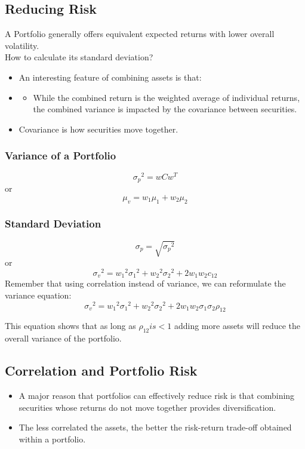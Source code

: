 \documentclass[11pt,a4paper]{report}
\begin{document}
\subsection{Reducing Risk}
A Portfolio generally offers equivalent expected returns with lower overall volatility.
\\How to calculate its standard deviation?
\begin{itemize}
    \item An interesting feature of combining assets is that:
    \item \begin{itemize}
        \item While the combined return is the weighted average of individual returns, the combined variance is impacted by the covariance between securities.
    \end{itemize}
    \item{Covariance is how securities move together.}
\end{itemize}
\subsubsection{Variance of a Portfolio}
\[\sigma_p{^2} = wCw^T\]
or
\[\mu_v = w_1\mu_1 + w_2\mu_2\]
\subsubsection{Standard Deviation}
\[\sigma_p = \sqrt{\sigma_p{^2}}\]
or
\[\sigma_v{^2} = w_1{^2}\sigma_1{^2} + w_2{^2}\sigma_2{^2} + 2w_1w_2c_{12}\]
Remember that using correlation instead of variance, we can reformulate the variance equation:
\[\sigma_v{^2} = w_1{^2}\sigma_1{^2} + w_2{^2}\sigma_2{^2} + 2w_1w_2\sigma_1\sigma_2\rho_{12}\]

This equation shows that as long as $\rho_{12} is < 1$ adding more assets will reduce the overall variance of the portfolio.

\subsection{Correlation and Portfolio Risk}
\begin{itemize}
    \item A major reason that portfolios can effectively reduce risk is that combining securities whose returns do not move together provides diversification.
    \item The less correlated the assets, the better the risk-return trade-off obtained within a portfolio.
\end{itemize}
\end{document}
